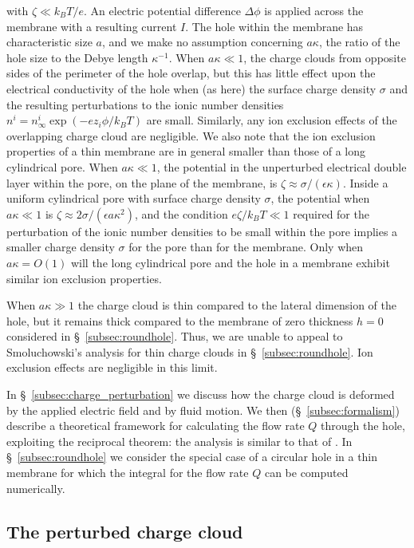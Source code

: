 with $\zeta\ll k_BT/e$. An electric potential difference $\Delta \phi$ is applied across the membrane with a resulting current $I$. The hole within the membrane has characteristic size $a$, and we make no assumption concerning $a\kappa$, the ratio of the hole size to the Debye length $\kappa^{-1}$. When $a\kappa\ll 1$, the charge clouds from opposite sides
of the perimeter of the hole overlap, but this has little effect upon the electrical conductivity of the hole when (as here) the surface charge density $\sigma$ and the resulting perturbations to the ionic number densities $n^i=n_\infty^i\exp(-ez_i\phi/k_BT)$ are small. Similarly, any ion exclusion effects of the overlapping charge cloud are negligible. We also note that the ion exclusion properties of a thin membrane are in general smaller than those of a long cylindrical pore. When $a\kappa\ll1$, the potential in the unperturbed electrical double layer within the pore, on the plane of the membrane, is $\zeta\approx\sigma/(\epsilon\kappa)$. Inside a uniform cylindrical pore with surface charge density $\sigma$, the potential when $a\kappa\ll 1$ is 
$\zeta\approx 2\sigma/(\epsilon a\kappa^2)$, and the condition $e\zeta/k_BT\ll 1$ required for the perturbation of the ionic number densities to be small within the pore implies a smaller charge density $\sigma$ for the pore than for the membrane. Only when $a\kappa=O(1)$ will the long cylindrical pore and the hole in a membrane exhibit similar ion exclusion properties.

When $a\kappa\gg 1$ the charge cloud is thin compared to the lateral dimension of the hole, but it remains thick compared to the membrane of zero thickness $h=0$ considered in \S~\ref{subsec:roundhole}. Thus, we are unable to appeal to Smoluchowski's analysis for thin charge clouds in \S~\ref{subsec:roundhole}. Ion exclusion effects are negligible in this limit.

In \S~\ref{subsec:charge_perturbation} we discuss how the charge cloud is deformed by the applied electric field and by fluid motion. We then (\S~\ref{subsec:formalism}) describe a theoretical framework for calculating the flow rate $Q$ through the hole, exploiting the reciprocal theorem: the analysis is similar to that of \cite{Sherwood1995}.  In \S~\ref{subsec:roundhole} we consider the special case of a circular hole in a thin membrane for which the integral for the flow rate $Q$ can be computed numerically.


\subsection{\label{subsec:charge_perturbation}The perturbed charge cloud}

